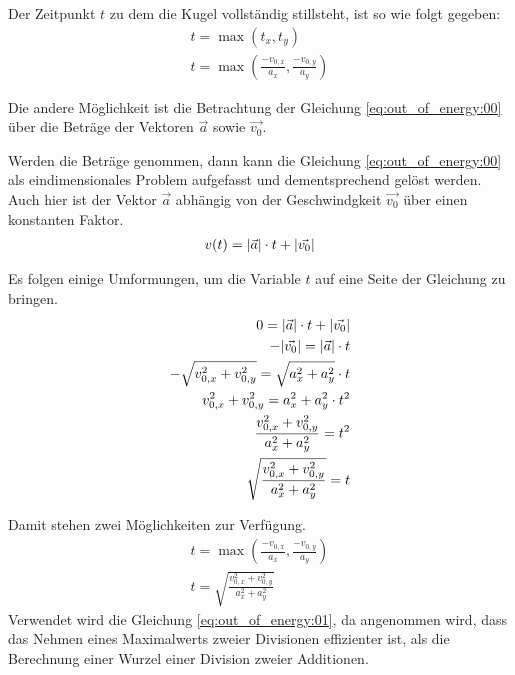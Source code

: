 Der Zeitpunkt $t$ zu dem die Kugel vollständig stillsteht, ist so wie folgt gegeben:
\begin{align}
    t = \max{(t_x, t_y)}\\
    t = \max{(\frac{-v_{0,x}}{a_x}, \frac{-v_{0,y}}{a_y})}
\end{align}

Die andere Möglichkeit ist die Betrachtung der Gleichung \ref{eq:out_of_energy:00} über die Beträge der Vektoren
$\vec{a}$ sowie $\vec{v_0}$.

Werden die Beträge genommen, dann kann die Gleichung \ref{eq:out_of_energy:00} als eindimensionales Problem aufgefasst und
dementsprechend gelöst werden. Auch hier ist der Vektor $\vec{a}$ abhängig von der Geschwindgkeit $\vec{v_0}$ über einen
konstanten Faktor.
\begin{align}
    v(t) = \lvert \vec{a} \rvert \cdot t + \lvert \vec{v_0} \rvert
\end{align}

Es folgen einige Umformungen, um die Variable $t$ auf eine Seite der Gleichung zu bringen.
\begin{align}
    0 = \lvert \vec{a} \rvert \cdot t + \lvert \vec{v_0} \rvert\\
    -\lvert \vec{v_0} \rvert = \lvert \vec{a} \rvert \cdot t\\
    -\sqrt{v_{0,x}^2 + v_{0,y}^2} = \sqrt{a_x^2 + a_y^2} \cdot t\\
    v_{0,x}^2 + v_{0,y}^2 = a_x^2 + a_y^2 \cdot t^2\\
    \frac{v_{0,x}^2 + v_{0,y}^2}{a_x^2 + a_y^2} = t^2\\
    \sqrt{\frac{v_{0,x}^2 + v_{0,y}^2}{a_x^2 + a_y^2}} = t
\end{align}

Damit stehen zwei Möglichkeiten zur Verfügung.
\begin{align}
    t = \max{(\frac{-v_{0,x}}{a_x}, \frac{-v_{0,y}}{a_y})}\label{eq:out_of_energy:01}\\
    t = \sqrt{\frac{v_{0,x}^2 + v_{0,y}^2}{a_x^2 + a_y^2}}
\end{align}
Verwendet wird die Gleichung \ref{eq:out_of_energy:01}, da angenommen wird, dass das Nehmen eines Maximalwerts zweier
Divisionen effizienter ist, als die Berechnung einer Wurzel einer Division zweier Additionen.